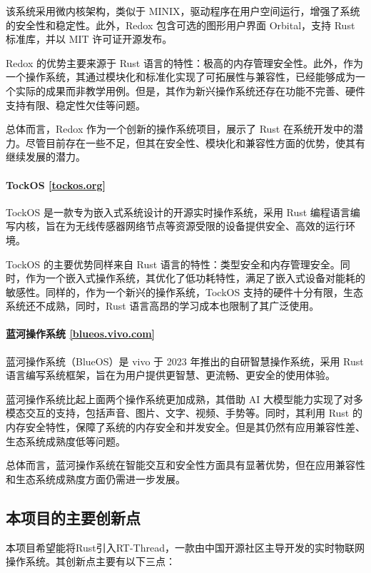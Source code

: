 该系统采用微内核架构，类似于 MINIX，驱动程序在用户空间运行，增强了系统的安全性和稳定性。此外，Redox 包含可选的图形用户界面 Orbital，支持 Rust 标准库，并以 MIT 许可证开源发布。

Redox 的优势主要来源于 Rust 语言的特性：极高的内存管理安全性。此外，作为一个操作系统，其通过模块化和标准化实现了可拓展性与兼容性，已经能够成为一个实际的成果而非教学用例。但是，其作为新兴操作系统还存在功能不完善、硬件支持有限、稳定性欠佳等问题。

总体而言，Redox 作为一个创新的操作系统项目，展示了 Rust 在系统开发中的潜力。尽管目前存在一些不足，但其在安全性、模块化和兼容性方面的优势，使其有继续发展的潜力。

\paragraph{TockOS \href{https://tockos.org/}{[tockos.org]}}

TockOS 是一款专为嵌入式系统设计的开源实时操作系统，采用 Rust 编程语言编写内核，旨在为无线传感器网络节点等资源受限的设备提供安全、高效的运行环境。

TockOS 的主要优势同样来自 Rust 语言的特性：类型安全和内存管理安全。同时，作为一个嵌入式操作系统，其优化了低功耗特性，满足了嵌入式设备对能耗的敏感性。同样的，作为一个新兴的操作系统，TockOS 支持的硬件十分有限，生态系统还不成熟，同时，Rust 语言高昂的学习成本也限制了其广泛使用。

\paragraph{蓝河操作系统 \href{https://blueos.vivo.com/system}{[blueos.vivo.com]}}

蓝河操作系统（BlueOS）是 vivo 于 2023 年推出的自研智慧操作系统，采用 Rust 语言编写系统框架，旨在为用户提供更智慧、更流畅、更安全的使用体验。

蓝河操作系统比起上面两个操作系统更加成熟，其借助 AI 大模型能力实现了对多模态交互的支持，包括声音、图片、文字、视频、手势等。同时，其利用 Rust 的内存安全特性，保障了系统的内存安全和并发安全。但是其仍然有应用兼容性差、生态系统成熟度低等问题。

总体而言，蓝河操作系统在智能交互和安全性方面具有显著优势，但在应用兼容性和生态系统成熟度方面仍需进一步发展。
\subsection{本项目的主要创新点}

本项目希望能将Rust引入RT-Thread，一款由中国开源社区主导开发的实时物联网操作系统。其创新点主要有以下三点：

